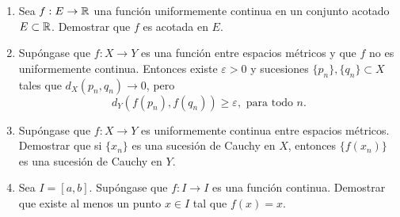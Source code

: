 \begin{enumerate}
    \item Sea $f : E \to \mathbb{R}$ una función uniformemente continua en un conjunto acotado $E \subset \mathbb{R}$. Demostrar que $f$ es acotada en $E$.
    
    \item Supóngase que $f : X \to Y$ es una función entre espacios métricos y que $f$ no es uniformemente continua. Entonces existe $\varepsilon > 0$ y sucesiones $\{p_n\}, \{q_n\} \subset X$ tales que $d_X(p_n, q_n) \to 0$, pero
    \[ d_Y(f(p_n), f(q_n)) \geq \varepsilon, \text{ para todo } n. \]
    
    \item Supóngase que $f : X \to Y$ es uniformemente continua entre espacios métricos. Demostrar que si $\{x_n\}$ es una sucesión de Cauchy en $X$, entonces $\{f(x_n)\}$ es una sucesión de Cauchy en $Y$.
    
    \item Sea $I = [a, b]$. Supóngase que $f : I \to I$ es una función continua. Demostrar que existe al menos un punto $x \in I$ tal que $f(x) = x$.
\end{enumerate}